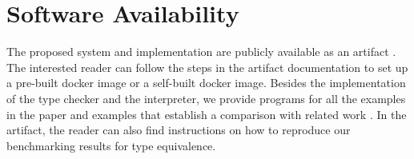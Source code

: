 \section*{Software Availability}
\label{sec:artifact}

The proposed system and implementation are publicly available as an artifact \cite{artifact}. The interested reader can follow the steps in the artifact documentation to set up a pre-built docker image or a self-built docker image. Besides the implementation of the type checker and the interpreter, we provide programs for all the examples in the paper and examples that establish a comparison with related work \cite{DBLP:conf/esop/DasDMP21,DBLP:conf/icfp/ThiemannV16}. In the artifact, the reader can also find instructions on how to reproduce our benchmarking results for type equivalence.

